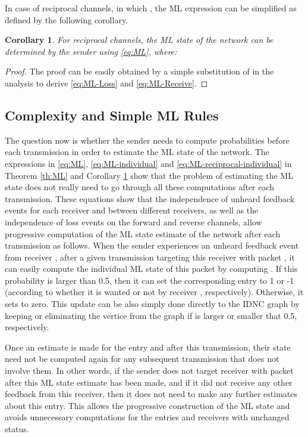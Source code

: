 \documentclass[10pt,jounral]{IEEEtran}
\newtheorem{corollary}{Corollary}
\begin{document}
In case of reciprocal channels, in which , the ML expression can be simplified as defined by the following corollary.
\begin{corollary}\label{th:ML-reciprocal}
For reciprocal channels, the ML state of the network can be determined by the sender using \eqref{eq:ML}, where:

\end{corollary}
\begin{proof}
The proof can be easily obtained by a simple substitution of  in the analysis to derive \eqref{eq:ML-Loss} and \eqref{eq:ML-Receive}.
\end{proof}


\subsection{Complexity and Simple ML Rules}
The question now is whether the sender needs to compute  probabilities before each transmission in order to estimate the ML state of the network. The expressions in \eqref{eq:ML}, \eqref{eq:ML-individual} and \eqref{eq:ML-reciprocal-individual} in Theorem \ref{th:ML} and Corollary \ref{th:ML-reciprocal} show that the problem of estimating the ML state does not really need to go through all these computations after each transmission. These equations show that the independence of unheard feedback events for each receiver and between different receivers, as well as the independence of loss events on the forward and reverse channels, allow progressive computation of the ML state estimate of the network after each transmission as follows. When the sender experiences an unheard feedback event from receiver , after a given transmission targeting this receiver with packet , it can easily compute the individual ML state of this packet by computing . If this probability is larger than 0.5, then it can set the corresponding entry  to 1 or -1 (according to whether it is wanted or not by receiver , respectively). Otherwise, it sets  to zero. This update can be also simply done directly to the IDNC graph by keeping or eliminating the vertice  from the graph if  is larger or smaller that 0.5, respectively.

Once an estimate is made for the entry  and  after this transmission, their state need not be computed again for any subsequent transmission that does not involve them. In other words, if the sender does not target receiver  with packet  after this ML state estimate has been made, and if it did not receive any other feedback from this receiver, then it does not need to make any further estimates about this  entry. This allows the progressive construction of the ML state and avoids unnecessary computations for the entries and receivers with unchanged status.
\end{document}
